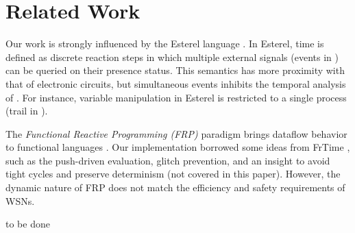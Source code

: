 \section{Related Work}
\label{sec.related}

Our work is strongly influenced by the Esterel language \cite{esterel.design}.
In Esterel, time is defined as discrete reaction steps in which multiple 
external signals (events in \CEU) can be queried on their presence status.
This semantics has more proximity with that of electronic circuits, but 
simultaneous events inhibits the temporal analysis of \CEU.
For instance, variable manipulation in Esterel is restricted to a single 
process (trail in \CEU).


The \emph{Functional Reactive Programming (FRP)} paradigm brings dataflow 
behavior to functional languages \cite{frp.principles}.
Our implementation borrowed some ideas from FrTime \cite{frp.embedding}, such 
as the push-driven evaluation, glitch prevention, and an insight to avoid tight 
cycles and preserve determinism (not covered in this paper).
However, the dynamic nature of FRP does not match the efficiency and safety 
requirements of WSNs.

to be done

